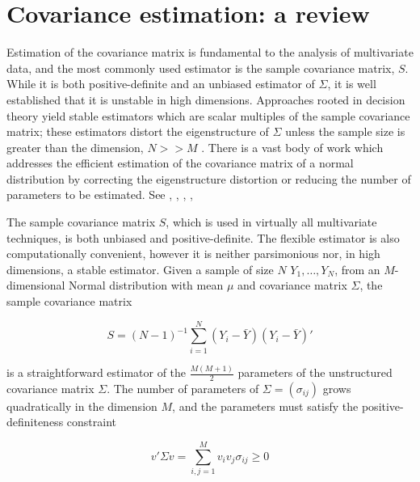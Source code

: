 

\chapter{Covariance estimation: a review} \label{background-review-chapter}

\indent

Estimation of the covariance matrix is fundamental to the analysis of multivariate data, and the most commonly used estimator is the sample covariance matrix, $S$. While it is both positive-definite and an unbiased estimator of $\Sigma$, it is well established that  it is unstable in high dimensions. Approaches rooted in decision theory yield stable estimators which are scalar multiples of the sample covariance matrix; these estimators distort the eigenstructure of $\Sigma$ unless the sample size is greater than the dimension, $N >> M$ \citep{dempster1972covariance}.  There is a vast body of work which addresses the efficient estimation of the covariance matrix of a normal distribution by correcting the eigenstructure distortion or reducing the number of parameters to be estimated. See \cite{stein1975estimation}, \cite{lin1985monte}, \cite{yang1994estimation}, \cite{daniels1999nonconjugate}, \cite{champion2003empirical} 

\bigskip

The sample covariance matrix $S$, which is used in virtually all multivariate techniques, is both unbiased and positive-definite. The flexible estimator is also computationally convenient, however it is neither parsimonious nor, in high dimensions, a stable estimator. Given a sample of size $N$ $Y_1,\dots , Y_N$, from an $M$-dimensional Normal distribution with mean $\mu$ and covariance matrix $\Sigma$, the sample covariance matrix

\begin{equation} \label{eq:sample-covariance-matrix}
S = \left(N-1\right)^{-1} \sum_{i = 1}^N \left(Y_i - \bar{Y}\right)\left(Y_i - \bar{Y}\right)'
\end{equation}

\noindent
is a straightforward estimator of the $\frac{M\left(M+1\right)}{2}$ parameters of the unstructured covariance matrix $\Sigma$. The number of parameters of $\Sigma = \left( \sigma_{ij} \right)$ grows quadratically in the dimension $M$, and the parameters must satisfy the positive-definiteness constraint

\begin{equation} \label{eq:positive-definite-constraint} 
v'\Sigma v = \sum_{i,j = 1}^M v_i v_j \sigma_{ij} \ge 0 
\end{equation}


